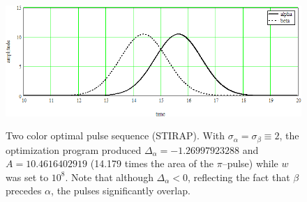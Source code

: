 \begin{figure}
\centering
\includegraphics[width=5.00in]
{solution_2_pulses/solution_2_pulses.png}\\
\caption[Two color optimal pulse sequence (STIRAP)]{Two color optimal pulse sequence (STIRAP). With $\sigma_{\alpha}=\sigma_{\beta}\equiv 2$, the optimization program produced $\Delta_\alpha=-1.26997923288$ and $A=10.4616402919$ (14.179 times the area of the $\pi$--pulse) while $w$ was set to $10^8$. Note that although $\Delta_\alpha<0$, reflecting the fact that $\beta$ precedes $\alpha$, the pulses significantly overlap.}
\label{solution 2 pulses}
\end{figure} 
